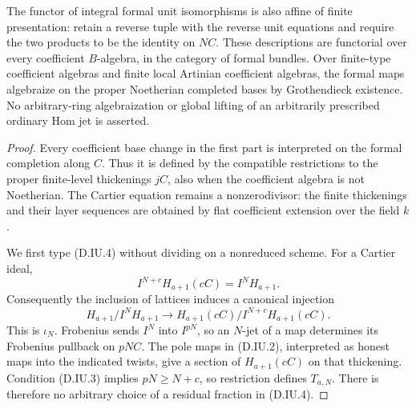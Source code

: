 \begin{proposition}
The functor of integral formal unit isomorphisms is also
affine of finite presentation: retain a reverse tuple with
the reverse unit equations and require the two products
to be the identity on $NC$. These descriptions are functorial
over every coefficient $B$-algebra, in the category of formal
bundles. Over finite-type coefficient algebras and finite
local Artinian coefficient algebras, the formal maps
algebraize on the proper Noetherian completed bases by
Grothendieck existence. No arbitrary-ring algebraization
or global lifting of an arbitrarily prescribed ordinary
Hom jet is asserted.
\end{proposition}

\begin{proof}
Every coefficient base change in the first part is interpreted
on the formal completion along $C$. Thus it is defined by the
compatible restrictions to the proper finite-level thickenings $jC$,
also when the coefficient algebra is not Noetherian. The
Cartier equation remains a nonzerodivisor: the finite
thickenings and their layer sequences are obtained by flat
coefficient extension over the field $k$.

We first type (D.IU.4) without dividing on a nonreduced
scheme. For a Cartier ideal,
\[
                 I^{N+c}H_{a+1}(cC)=I^N H_{a+1}.
                                                        \tag{D.IU.5}
\]
Consequently the inclusion of lattices induces a canonical
injection
\[
 H_{a+1}/I^N H_{a+1}\longrightarrow
 H_{a+1}(cC)/I^{N+c}H_{a+1}(cC).
                                                        \tag{D.IU.6}
\]
This is $\iota_N$. Frobenius sends $I^N$ into $I^{pN}$,
so an $N$-jet of a map determines its Frobenius pullback
on $pNC$. The pole maps in (D.IU.2), interpreted as honest
maps into the indicated twists, give a section of
$H_{a+1}(cC)$ on that thickening. Condition (D.IU.3)
implies $pN\ge N+c$, so restriction defines $T_{a,N}$.
There is therefore no arbitrary choice of a residual
fraction in (D.IU.4).


\end{proof}
